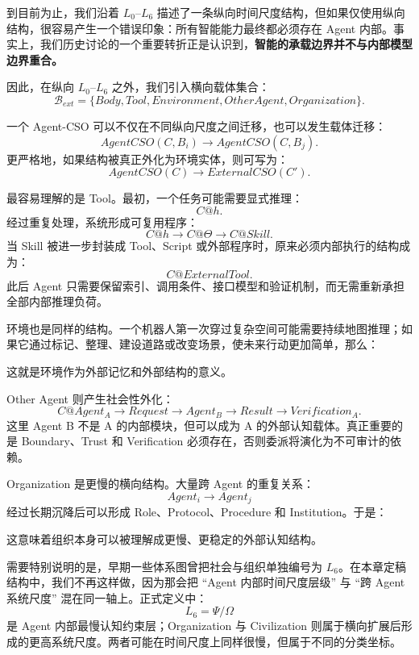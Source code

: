 到目前为止，我们沿着 $L_0$--$L_6$ 描述了一条纵向时间尺度结构，但如果仅使用纵向结构，很容易产生一个错误印象：所有智能能力最终都必须存在 Agent 内部。事实上，我们历史讨论的一个重要转折正是认识到，\textbf{智能的承载边界并不与内部模型边界重合。}

因此，在纵向 $L_0$--$L_6$ 之外，我们引入横向载体集合：
\[
\mathcal B_{ext}
=
\{
Body,
Tool,
Environment,
OtherAgent,
Organization
\}.
\]

一个 Agent-CSO 可以不仅在不同纵向尺度之间迁移，也可以发生载体迁移：
\[
AgentCSO(C,B_i)
\rightarrow
AgentCSO(C,B_j).
\]
更严格地，如果结构被真正外化为环境实体，则可写为：
\[
AgentCSO(C)
\rightarrow
ExternalCSO(C').
\]

最容易理解的是 Tool。最初，一个任务可能需要显式推理：
\[
C@h.
\]
经过重复处理，系统形成可复用程序：
\[
C@h
\rightarrow
C@\Theta
\rightarrow
C@Skill.
\]
当 Skill 被进一步封装成 Tool、Script 或外部程序时，原来必须内部执行的结构成为：
\[
C@ExternalTool.
\]
此后 Agent 只需要保留索引、调用条件、接口模型和验证机制，而无需重新承担全部内部推理负荷。

环境也是同样的结构。一个机器人第一次穿过复杂空间可能需要持续地图推理；如果它通过标记、整理、建设道路或改变场景，使未来行动更加简单，那么：
\begin{statementbox}
\centering
{}
\end{statementbox}
这就是环境作为外部记忆和外部结构的意义。

Other Agent 则产生社会性外化：
\[
C@Agent_A
\rightarrow
Request
\rightarrow
Agent_B
\rightarrow
Result
\rightarrow
Verification_A.
\]
这里 Agent B 不是 A 的内部模块，但可以成为 A 的外部认知载体。真正重要的是 Boundary、Trust 和 Verification 必须存在，否则委派将演化为不可审计的依赖。

Organization 是更慢的横向结构。大量跨 Agent 的重复关系：
\[
Agent_i
\rightarrow
Agent_j
\]
经过长期沉降后可以形成 Role、Protocol、Procedure 和 Institution。于是：
\begin{statementbox}
\centering
{}
\end{statementbox}
这意味着组织本身可以被理解成更慢、更稳定的外部认知结构。

需要特别说明的是，早期一些体系图曾把社会与组织单独编号为 $L_6$。在本章定稿结构中，我们不再这样做，因为那会把 ``Agent 内部时间尺度层级'' 与 ``跨 Agent 系统尺度'' 混在同一轴上。正式定义中：
\[
L_6
=
\Psi/\Omega
\]
是 Agent 内部最慢认知约束层；Organization 与 Civilization 则属于横向扩展后形成的更高系统尺度。两者可能在时间尺度上同样很慢，但属于不同的分类坐标。

